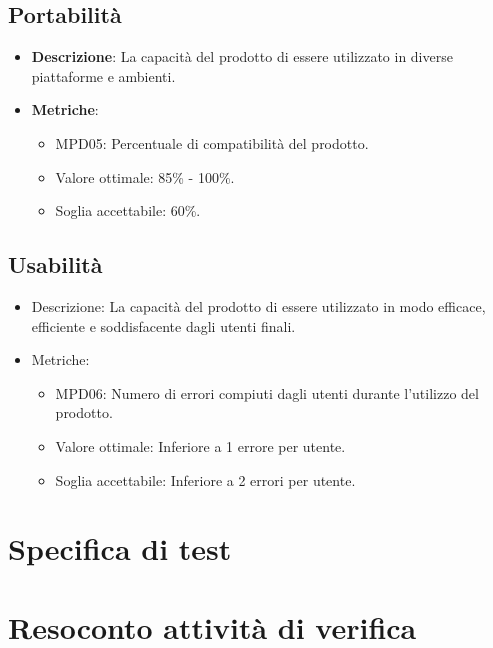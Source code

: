 \documentclass[12pt]{article}
\begin{document}
\subsection{Portabilità}
\begin{itemize}
	\item \textbf{Descrizione}: La capacità del prodotto di essere utilizzato in diverse piattaforme e ambienti.
	\item \textbf{Metriche}:
	      \begin{itemize}
		      \item MPD05: Percentuale di compatibilità del prodotto.
		      \item Valore ottimale: 85\% - 100\%.
		      \item Soglia accettabile: 60\%.
	      \end{itemize}
\end{itemize}

\subsection{Usabilità}
\begin{itemize}
	\item Descrizione: La capacità del prodotto di essere utilizzato in modo efficace, efficiente e soddisfacente dagli utenti finali.
	\item Metriche:
	      \begin{itemize}
		      \item MPD06: Numero di errori compiuti dagli utenti durante l'utilizzo del prodotto.
		      \item Valore ottimale: Inferiore a 1 errore per utente.
		      \item Soglia accettabile: Inferiore a 2 errori per utente.
	      \end{itemize}
\end{itemize}

\section{Specifica di test}
\section {Resoconto attività di verifica}
\end{document}
